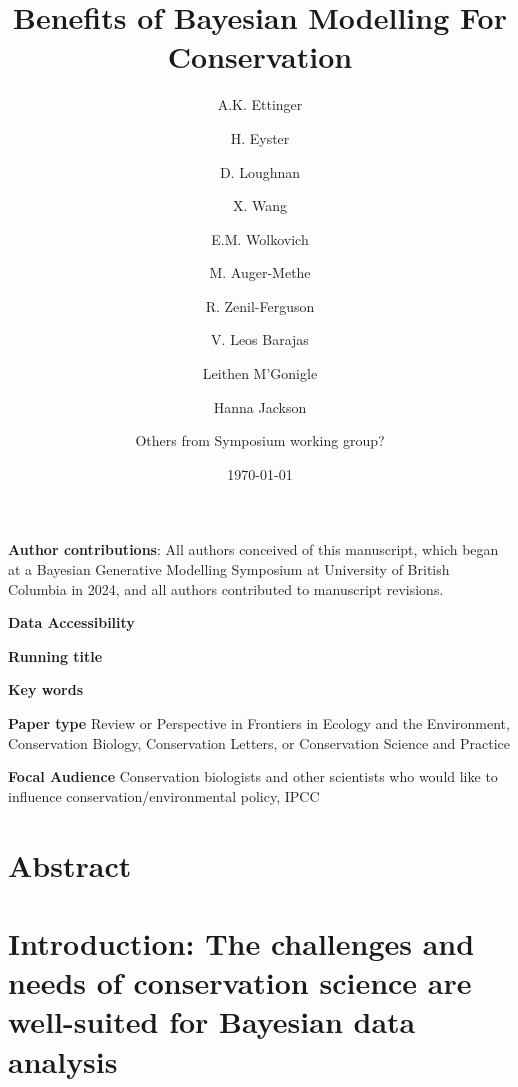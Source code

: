 \documentclass{article}
\begin{document}



\title{Benefits of Bayesian Modelling For Conservation} 
\author[1,a]{A.K. Ettinger}
\author[2]{H. Eyster}
\author[3]{D. Loughnan}
\author[3]{X. Wang}
\author[3]{E.M. Wolkovich}
\author[3]{M. Auger-Methe}
\author[4]{R. Zenil-Ferguson}
\author[5]{V. Leos Barajas}
\author[6]{Leithen M'Gonigle}
\author[6]{Hanna Jackson}
\author[7]{Others from Symposium working group?}





\date{\today}
\maketitle 
\textbf{Author contributions}: All authors conceived of this manuscript, which began at a Bayesian Generative Modelling Symposium at University of British Columbia in 2024, and all authors contributed to manuscript revisions.

\textbf{Data Accessibility} 

\textbf{Running title} 

\textbf{Key words} 


\textbf{Paper type} Review or Perspective in Frontiers in Ecology and the Environment, Conservation Biology, Conservation Letters, or Conservation Science and Practice

\textbf{Focal Audience} Conservation biologists and other scientists who would like to influence conservation/environmental policy, IPCC 






\section*{Abstract} 


\newpage
\section* {Introduction: The challenges and needs of conservation science are well-suited for Bayesian data analysis}
\end{document}
